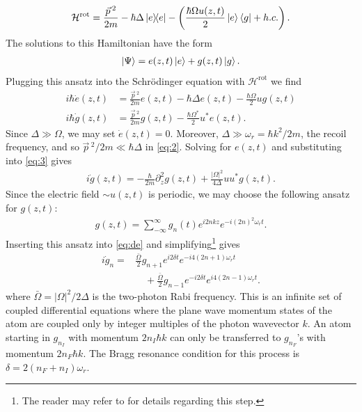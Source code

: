 \documentclass[reprint,
nofootinbib,
amsmath,amssymb,
aps]{revtex4-1}
\newcommand{\p}{\partial}
\newcommand{\f}[2]{\frac{#1}{#2}}
\newcommand{\lp}{\left(}
\newcommand{\rp}{\right)}
\begin{document}
\begin{align*}
\mathcal{H}^\text{rot} = \f{\vec{p}\,^2}{2m} -\hbar \Delta  \ketbra{e} -\lp \f{\hbar\Omega u(z,t)}{2}\ket{e}\bra{g} + h.c.\rp.
\end{align*}
The solutions to this Hamiltonian have the form 
\begin{align*}
\ket{\Psi} = e(z,t)\ket{e} + g(z,t)\ket{g}.
\end{align*} 
Plugging this ansatz into the Schr\"{o}dinger equation with $\mathcal{H}^\text{rot}$ we find 
\begin{align}
i\hbar \dot{e}(z,t) &= \f{\vec{p}\,^2}{2m} e(z,t) - \hbar \Delta e(z,t) - \f{\hbar\Omega}{2}ug(z,t)\label{eq:2}\\
i\hbar \dot{g}(z,t) &= \f{\vec{p}\,^2}{2m} g(z,t) - \f{\hbar\Omega^*}{2}u^*e(z,t)\label{eq:3}.
\end{align}
Since $\Delta \gg \Omega$, we may set $\dot{e}(z,t) = 0$. Moreover, $\Delta \gg \omega_r = \hbar k^2/2m$, the recoil frequency, and so $\vec{p}\,^2/2m\ll \hbar \Delta$ in \eqref{eq:2}. Solving for $e(z,t)$ and substituting into \eqref{eq:3} gives
\begin{align}\label{eq:de}
i\dot{g}(z,t) = -\f{\hbar}{2m}\p_z^2 g(z,t) + \f{|\Omega|^2}{4\Delta} uu^* g(z,t).
\end{align}
Since the electric field $\sim u(z,t)$ is periodic, we may choose the following ansatz for $g(z,t)$:
\begin{align}\label{eq:ansatz}
g(z,t) = \sum_{-\infty}^\infty g_n(t) e^{i2nkz} e^{-i(2n)^2 \omega_r t}.
\end{align}
Inserting this ansatz into \eqref{eq:de} and simplifying\footnote{The reader may refer to \cite{estey2016precision} for details regarding this step.} gives
\begin{align}\label{eq:soln}
i\dot{g}_n = &\f{\bar{\Omega}}{2} g_{n+1} e^{i2\delta t} e^{-i 4(2n+1) \omega_r t} \nonumber\\
&\quad+ \f{\bar{\Omega}}{2}g_{n-1} e^{-i2\delta t} e^{i4(2n-1)\omega_r t}.
\end{align}
where $\bar{\Omega} = |\Omega|^2/2\Delta$ is the two-photon Rabi frequency. This is an infinite set of coupled differential equations where the plane wave momentum states of the atom are coupled only by integer multiples of the photon wavevector $k$. An atom starting in $g_{n_I}$ with momentum $2n_I \hbar k$ can only be transferred to $g_{n_F}$'s with momentum $2n_F \hbar k$. The Bragg resonance condition for this process is $\delta = 2(n_F + n_I)\omega_r$. 
\end{document}

